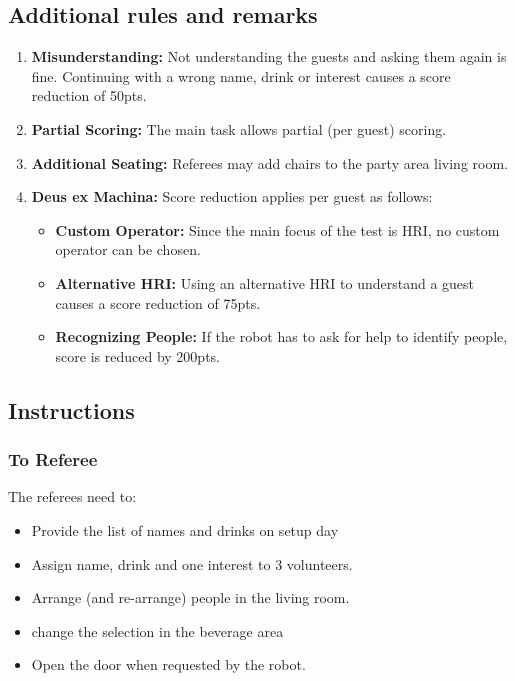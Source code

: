 \subsection*{Additional rules and remarks}
\begin{enumerate}[nosep]
	\item \textbf{Misunderstanding:} Not understanding the guests and asking them again is fine. Continuing with a wrong name, drink  or interest causes a score reduction of 50pts.
		
	\item \textbf{Partial Scoring:} The main task allows partial (per guest) scoring.

	\item \textbf{Additional Seating:} Referees may add chairs to the party area living room.
	
	\item \textbf{Deus ex Machina:} Score reduction applies per guest as follows:
	\begin{itemize}[nosep]
		\item \textbf{Custom Operator:} Since the main focus of the test is HRI, no custom operator can be chosen.
		\item \textbf{Alternative HRI:} Using an alternative HRI to understand a guest causes a score reduction of 75pts.
		\item \textbf{Recognizing People:} If the robot has to ask for help to identify people, score is reduced by 200pts. 
	\end{itemize}
\end{enumerate}


\subsection*{Instructions}

\subsubsection*{To Referee}

The referees need to:
\begin{itemize}
	\item Provide the list of names and drinks on setup day
	\item Assign name, drink and one interest to 3 volunteers.
	\item Arrange (and re-arrange) people in the living room.
	\item change the selection in the beverage area
	\item Open the door when requested by the robot.
\end{itemize}

